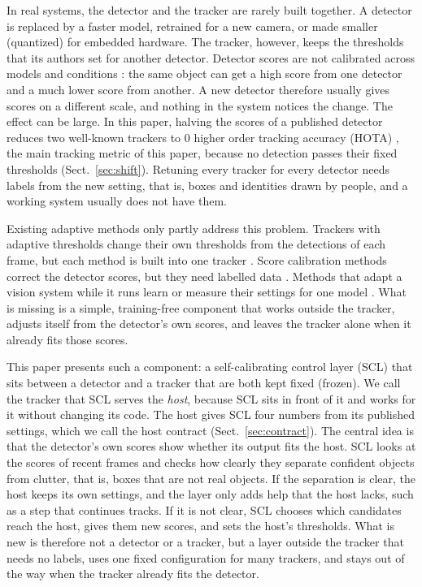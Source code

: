 \documentclass[pdflatex,sn-mathphys-num,iicol]{sn-jnl}
\newcommand{\scl}{SCL}
\begin{document}
In real systems, the detector and the tracker are rarely built together. A detector is replaced by
a faster model, retrained for a new camera, or made smaller (quantized) for embedded hardware. The
tracker, however, keeps the thresholds that its authors set for another detector. Detector scores
are not calibrated across models and conditions \cite{kuppers2020detcalib}: the same object can get
a high score from one detector and a much lower score from another. A new detector therefore
usually gives scores on a different scale, and nothing in the system notices the change. The effect
can be large. In this paper, halving the scores of a published detector reduces two well-known
trackers to 0 higher order tracking accuracy (HOTA) \cite{luiten2021hota}, the main tracking metric
of this paper, because no detection passes their fixed thresholds (Sect.~\ref{sec:shift}).
Retuning every tracker for every detector needs labels from the new setting, that is, boxes and
identities drawn by people, and a working system usually does not have them.

Existing adaptive methods only partly address this problem. Trackers with adaptive thresholds
change their own thresholds from the detections of each frame, but each method is built into one
tracker \cite{ma2023adaptivebytetrack,shim2024adaptrack,act2026adaptive}. Score calibration methods
correct the detector scores, but they need labelled data \cite{kuppers2020detcalib}. Methods that
adapt a vision system while it runs learn or measure their settings for one model
\cite{han2022dynamic,jiang2018chameleon}. What is missing is a simple, training-free component that
works outside the tracker, adjusts itself from the detector's own scores, and leaves the tracker
alone when it already fits those scores.

This paper presents such a component: a self-calibrating control layer (\scl{}) that sits between
a detector and a tracker that are both kept fixed (frozen). We call the tracker that \scl{} serves
the \emph{host}, because \scl{} sits in front of it and works for it without changing its code. The
host gives \scl{} four numbers from its published settings, which we call the host contract
(Sect.~\ref{sec:contract}). The central idea is that the detector's own scores show whether its
output fits the host. \scl{} looks at the scores of recent frames and checks how clearly they
separate confident objects from clutter, that is, boxes that are not real objects. If the
separation is clear, the host keeps its own settings, and the layer only adds help that the host
lacks, such as a step that continues tracks. If it is not clear, \scl{} chooses which candidates
reach the host, gives them new scores, and sets the host's thresholds. What is new is therefore not
a detector or a tracker, but a layer outside the tracker that needs no labels, uses one fixed
configuration for many trackers, and stays out of the way when the tracker already fits the
detector.
\end{document}
